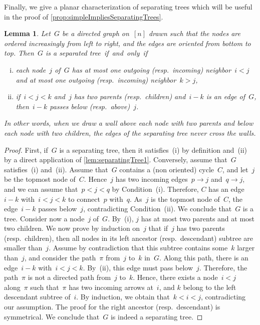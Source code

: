 \documentclass{amsart}
\newtheorem{lemma}[theorem]{Lemma}
\theoremstyle{definition}
\begin{document}
Finally, we give a planar characterization of separating trees which will be useful in the proof of \cref{prop:simpleImpliesSeparatingTrees}.

\begin{lemma}
\label{lem:separatingTree2}
Let~$G$ be a directed graph on~$[n]$ drawn such that the nodes are ordered increasingly from left to right, and the edges are oriented from bottom to top.
Then~$G$ is a separated tree~if~and~only~if
\begin{enumerate}[(i)]
\item each node~$j$ of~$G$ has at most one outgoing (resp.~incoming) neighbor~$i < j$ and at most one outgoing (resp.~incoming) neighbor~$k > j$,
\item if~$i < j < k$ and~$j$ has two parents (resp.~children) and~$i-k$ is an edge of~$G$, then~$i-k$ passes below (resp.~above)~$j$.
\end{enumerate}
In other words, when we draw a wall above each node with two parents and below each node with two children, the edges of the separating tree never cross the walls.
\end{lemma}

\begin{proof}
First, if~$G$ is a separating tree, then it satisfies~(i) by definition and~(ii) by a direct application of \cref{lem:separatingTree1}.
Conversely, assume that~$G$ satisfies~(i) and~(ii).
Assume that~$G$ contains a (non oriented) cycle~$C$, and let~$j$ be the topmost node of~$C$.
Hence~$j$ has two incoming edges~$p \to j$ and~$q \to j$, and we can assume that~$p < j < q$ by Condition~(i).
Therefore, $C$ has an edge~$i-k$ with~$i < j < k$ to connect~$p$ with~$q$.
As~$j$ is the topmost node of~$C$, the edge~$i-k$ passes below~$j$, contradicting Condition~(ii).
We conclude that~$G$ is a tree.
Consider now a node~$j$ of~$G$.
By~(i), $j$ has at most two parents and at most two children.
We now prove by induction on~$j$ that if~$j$ has two parents (resp.~children), then all nodes in its left ancestor (resp.~descendant) subtree are smaller than~$j$.
Assume by contradiction that this subtree contains some~$k$ larger than~$j$, and consider the path~$\pi$ from~$j$ to~$k$ in~$G$.
Along this path, there is an edge~$i - k$ with~$i < j < k$.
By~(ii), this edge must pass below~$j$.
Therefore, the path~$\pi$ is not a directed path from~$j$ to~$k$.
Hence, there exists a node~$i < j$ along~$\pi$ such that~$\pi$ has two incoming arrows at~$i$, and $k$ belong to the left descendant subtree of~$i$.
By induction, we obtain that~$k < i < j$, contradicting our assumption.
The proof for the right ancestor (resp.~descendant) is symmetrical.
We conclude that~$G$ is indeed a separating tree.
\end{proof}
\end{document}
